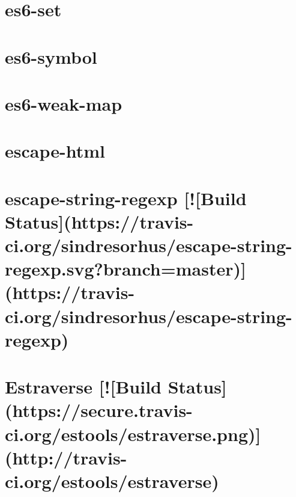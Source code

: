 \documentclass[twoside]{book}
\newcommand{\+}{\discretionary{\mbox{\scriptsize$\hookleftarrow$}}{}{}}
\begin{document}
\chapter{es6-\/set}
\label{md__c_1_workspace_demo_src_main_script_node_modules_es6-set__r_e_a_d_m_e}

\chapter{es6-\/symbol}
\label{md__c_1_workspace_demo_src_main_script_node_modules_es6-symbol__r_e_a_d_m_e}

\chapter{es6-\/weak-\/map}
\label{md__c_1_workspace_demo_src_main_script_node_modules_es6-weak-map__r_e_a_d_m_e}

\chapter{escape-\/html}
\label{md__c_1_workspace_demo_src_main_script_node_modules_escape-html__readme}

\chapter{escape-\/string-\/regexp \mbox{[}!\mbox{[}Build Status\mbox{]}(https\+://travis-\/ci.org/sindresorhus/escape-\/string-\/regexp.svg?branch=master)\mbox{]}(https\+://travis-\/ci.org/sindresorhus/escape-\/string-\/regexp)}
\label{md__c_1_workspace_demo_src_main_script_node_modules_escape-string-regexp_readme}

\chapter{Estraverse \mbox{[}!\mbox{[}Build Status\mbox{]}(https\+://secure.travis-\/ci.org/estools/estraverse.png)\mbox{]}(http\+://travis-\/ci.org/estools/estraverse)}
\label{md__c_1_workspace_demo_src_main_script_node_modules_escodegen_node_modules_estraverse__r_e_a_d_m_e}

\end{document}
